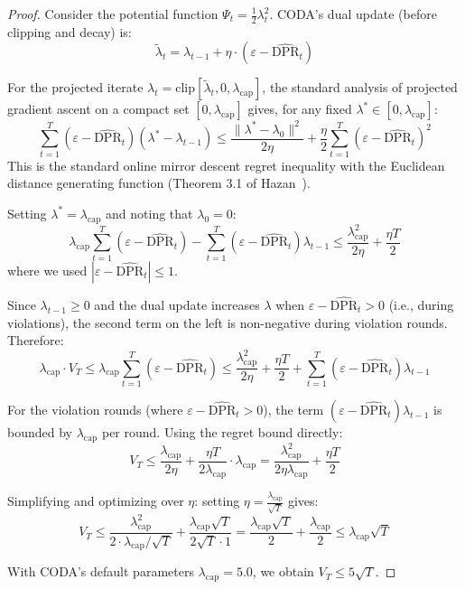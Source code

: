 \documentclass[10pt,twocolumn]{article}
\theoremstyle{definition}
\begin{document}
\begin{proof}
Consider the potential function $\Psi_t = \frac{1}{2}\lambda_t^2$. CODA's dual update (before clipping and decay) is:
\[
\tilde{\lambda}_{t} = \lambda_{t-1} + \eta \cdot (\varepsilon - \widehat{\text{DPR}}_t)
\]

For the projected iterate $\lambda_t = \text{clip}[\tilde{\lambda}_t, 0, \lambda_{\text{cap}}]$, the standard analysis of projected gradient ascent on a compact set $[0, \lambda_{\text{cap}}]$ gives, for any fixed $\lambda^* \in [0, \lambda_{\text{cap}}]$:
\begin{equation}
\sum_{t=1}^T (\varepsilon - \widehat{\text{DPR}}_t)(\lambda^* - \lambda_{t-1}) \leq \frac{\|\lambda^* - \lambda_0\|^2}{2\eta} + \frac{\eta}{2}\sum_{t=1}^T (\varepsilon - \widehat{\text{DPR}}_t)^2
\label{eq:regret_ineq}
\end{equation}
This is the standard online mirror descent regret inequality with the Euclidean distance generating function (Theorem 3.1 of Hazan~\cite{hazan2016introduction}).

Setting $\lambda^* = \lambda_{\text{cap}}$ and noting that $\lambda_0 = 0$:
\[
\lambda_{\text{cap}} \sum_{t=1}^T (\varepsilon - \widehat{\text{DPR}}_t) - \sum_{t=1}^T (\varepsilon - \widehat{\text{DPR}}_t)\lambda_{t-1} \leq \frac{\lambda_{\text{cap}}^2}{2\eta} + \frac{\eta T}{2}
\]
where we used $|\varepsilon - \widehat{\text{DPR}}_t| \leq 1$.

Since $\lambda_{t-1} \geq 0$ and the dual update increases $\lambda$ when $\varepsilon - \widehat{\text{DPR}}_t > 0$ (i.e., during violations), the second term on the left is non-negative during violation rounds. Therefore:
\[
\lambda_{\text{cap}} \cdot V_T \leq \lambda_{\text{cap}} \sum_{t=1}^T (\varepsilon - \widehat{\text{DPR}}_t) \leq \frac{\lambda_{\text{cap}}^2}{2\eta} + \frac{\eta T}{2} + \sum_{t=1}^T (\varepsilon - \widehat{\text{DPR}}_t)\lambda_{t-1}
\]

For the violation rounds (where $\varepsilon - \widehat{\text{DPR}}_t > 0$), the term $(\varepsilon - \widehat{\text{DPR}}_t)\lambda_{t-1}$ is bounded by $\lambda_{\text{cap}}$ per round. Using the regret bound directly:
\[
V_T \leq \frac{\lambda_{\text{cap}}}{2\eta} + \frac{\eta T}{2\lambda_{\text{cap}}} \cdot \lambda_{\text{cap}} = \frac{\lambda_{\text{cap}}^2}{2\eta \lambda_{\text{cap}}} + \frac{\eta T}{2}
\]

Simplifying and optimizing over $\eta$: setting $\eta = \frac{\lambda_{\text{cap}}}{\sqrt{T}}$ gives:
\[
V_T \leq \frac{\lambda_{\text{cap}}^2}{2 \cdot \lambda_{\text{cap}}/\sqrt{T}} + \frac{\lambda_{\text{cap}} \sqrt{T}}{2\sqrt{T} \cdot 1} = \frac{\lambda_{\text{cap}}\sqrt{T}}{2} + \frac{\lambda_{\text{cap}}}{2} \leq \lambda_{\text{cap}}\sqrt{T}
\]

With CODA's default parameters $\lambda_{\text{cap}} = 5.0$, we obtain $V_T \leq 5\sqrt{T}$.
\end{proof}
\end{document}
